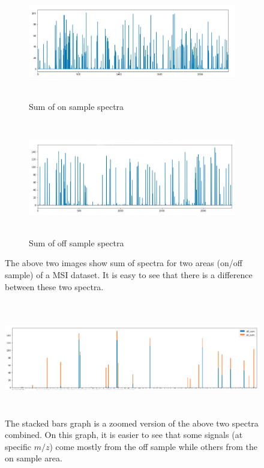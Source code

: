 \documentclass[a4paper]{article}
\begin{document}
    \begin{figure}[H]
        \begin{subfigure}[b]{\textwidth}
            \centering
            \includegraphics[width=\textwidth,height=5cm,keepaspectratio]{sum_ints_on_sample_graph.png}
            \caption{Sum of on sample spectra}
            \label{fig:sum_ints_on_sample_graph.png}
        \end{subfigure}
        \begin{subfigure}[b]{\textwidth}
            \centering
            \includegraphics[width=\textwidth,height=5cm,keepaspectratio]{sum_ints_off_sample_graph.png}
            \caption{Sum of off sample spectra}
            \label{fig:sum_ints_off_sample_graph.png}
        \end{subfigure}
        \caption{The above two images show sum of spectra for two areas (on/off sample) of a MSI dataset.
        It is easy to see that there is a difference between these two spectra.}
    \end{figure}
    
    \begin{figure}[H]
        \centering
            \includegraphics[width=\textwidth,height=5cm]{sum_int_stacked_bar.png}
        \caption{The stacked bars graph is a zoomed version of the above two spectra combined.
        On this graph, it is easier to see that some signals (at specific $m/z$) come mostly from
        the off sample while others from the on sample area.}
    \end{figure}
    
\end{document}
